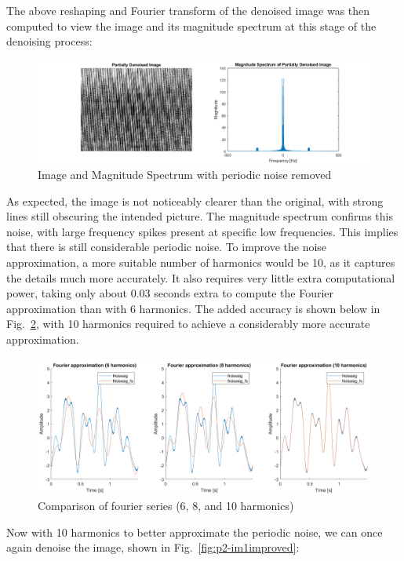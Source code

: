 \documentclass[12pt]{article}
\begin{document}
The above reshaping and Fourier transform of the denoised image was then
computed to view the image and its magnitude spectrum at this stage of the
denoising process:

\begin{figure}[ht]
    \centering
    \includegraphics{figures/p2-im1.png}
    \caption{Image and Magnitude Spectrum with periodic noise removed\label{fig:p2-im1}}
\end{figure}

As expected, the image is not noticeably clearer than the original, with strong
lines still obscuring the intended picture. The magnitude spectrum confirms
this noise, with large frequency spikes present at specific low frequencies.
This implies that there is still considerable periodic noise. To improve the
noise approximation, a more suitable number of harmonics would be 10, as it
captures the details much more accurately. It also requires very little extra
computational power, taking only about 0.03 seconds extra to compute the
Fourier approximation than with 6 harmonics. The added accuracy is shown below
in Fig.~\ref{fig:p2-compharms}, with 10 harmonics required to achieve a
considerably more accurate approximation.

\begin{figure}[ht]
    \centering
    \includegraphics{figures/p2-compharms.png}
    \caption{Comparison of fourier series (6, 8, and 10 harmonics)\label{fig:p2-compharms}}
\end{figure}

Now with 10 harmonics to better approximate the periodic noise, we can once
again denoise the image, shown in Fig.~\ref{fig:p2-im1improved}:
\end{document}
